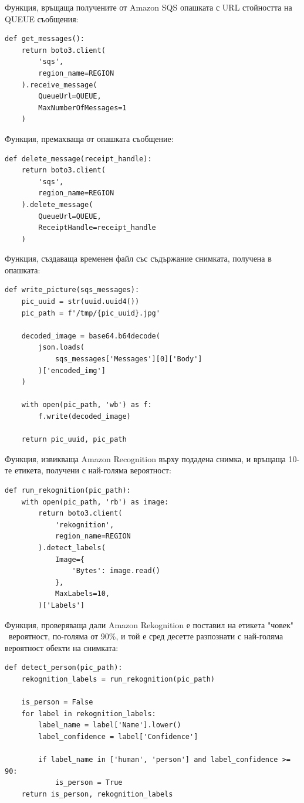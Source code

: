 \documentclass[12pt]{article}
\begin{document}
Функция, връщаща получените от Amazon SQS опашката с URL стойността на QUEUE съобщения:
\begin{verbatim}
def get_messages():
    return boto3.client(
        'sqs',
        region_name=REGION
    ).receive_message(
        QueueUrl=QUEUE,
        MaxNumberOfMessages=1
    )
\end{verbatim}

Функция, премахваща от опашката съобщение:
\begin{verbatim}
def delete_message(receipt_handle):
    return boto3.client(
        'sqs',
        region_name=REGION
    ).delete_message(
        QueueUrl=QUEUE,
        ReceiptHandle=receipt_handle
    )
\end{verbatim}

Функция, създаваща временен файл със съдържание снимката, получена в опашката:
\begin{verbatim}
def write_picture(sqs_messages):
    pic_uuid = str(uuid.uuid4())
    pic_path = f'/tmp/{pic_uuid}.jpg'

    decoded_image = base64.b64decode(
        json.loads(
            sqs_messages['Messages'][0]['Body']
        )['encoded_img']
    )

    with open(pic_path, 'wb') as f:
        f.write(decoded_image)

    return pic_uuid, pic_path
\end{verbatim}

Функция, извикваща Amazon Recognition върху подадена снимка, и връщаща 10-те етикета, получени с най-голяма вероятност:
\begin{verbatim}
def run_rekognition(pic_path):
    with open(pic_path, 'rb') as image:
        return boto3.client(
            'rekognition',
            region_name=REGION
        ).detect_labels(
            Image={
                'Bytes': image.read()
            },
            MaxLabels=10,
        )['Labels']
\end{verbatim}

Функция, проверяваща дали Amazon Rekognition е поставил на етикета "човек" \ вероятност, по-голяма от 90\%, и той е сред десетте разпознати с най-голяма вероятност обекти на снимката:
\begin{verbatim}
def detect_person(pic_path):
    rekognition_labels = run_rekognition(pic_path)

    is_person = False
    for label in rekognition_labels:
        label_name = label['Name'].lower()
        label_confidence = label['Confidence']

        if label_name in ['human', 'person'] and label_confidence >= 90:
            is_person = True
    return is_person, rekognition_labels
\end{verbatim}
\end{document}
